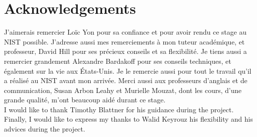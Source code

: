 
\clearpage{}
\pagestyle{empty}
\section*{Acknowledgements}

J'aimerais remercier Loïc Yon pour sa confiance et pour avoir rendu ce stage au
NIST possible. J'adresse aussi mes remerciements à mon tuteur académique, et
professeur, David Hill pour ses précieux conseils et sa flexibilité. Je tiens
aussi a remercier grandement Alexandre Bardakoff pour ses conseils techniques,
et également sur la vie aux États-Unis. Je le remercie aussi pour tout le
travail qu'il a réalisé au NIST avant mon arrivée. Merci aussi aux professeurs
d'anglais et de communication, Susan Arbon Leahy et Murielle Mouzat, dont les
cours, d'une grande qualité, m'ont beaucoup aidé durant ce stage.\\

I would like to thank Timothy Blattner for his guidance during the project.
Finally, I would like to express my thanks to Walid Keyrouz his flexibility and
his advices during the project.

\clearpage{}
